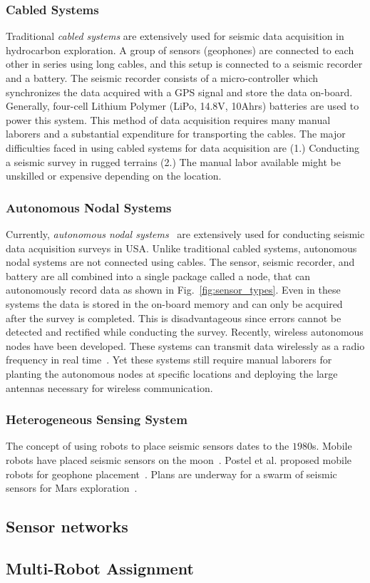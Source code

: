 \subsubsection{Cabled Systems}
 Traditional \emph{cabled systems} are extensively used for seismic data acquisition in hydrocarbon exploration. A group of sensors (geophones) are connected to each other in series using long cables, and this setup is connected to a seismic recorder and a battery. The seismic recorder consists of a micro-controller which synchronizes the data acquired with a GPS signal and store the data on-board. Generally, four-cell Lithium Polymer (LiPo, 14.8V, 10Ahrs) batteries are used to power this system. This method of data acquisition requires many manual laborers and a substantial expenditure for transporting the cables. The major difficulties faced in using cabled systems for data acquisition are (1.) Conducting a seismic survey in rugged terrains (2.) The manual labor available might be unskilled or expensive depending on the location.  
 \subsubsection{Autonomous Nodal Systems}
 Currently, \emph{autonomous nodal systems}~\cite{wood1998distributed} are extensively used for conducting seismic data acquisition surveys in USA. Unlike traditional cabled systems, autonomous nodal systems are not connected using cables. The sensor, seismic recorder, and battery are all combined into a single package called a node, that can autonomously record data as shown in Fig.~\ref{fig:sensor_types}. Even in these systems the data is stored in the on-board memory and can only be acquired after the survey is completed. This is disadvantageous since errors cannot be detected and rectified while conducting the survey. Recently, wireless autonomous nodes have been developed. These systems can transmit data wirelessly as a radio frequency in real time~\cite{jiang2015geophysical}. Yet these systems still require manual laborers for planting the autonomous nodes at specific locations and deploying the large antennas necessary for wireless communication.
\subsubsection{Heterogeneous Sensing System}
The concept of using robots to place seismic sensors dates to the $1980$s. Mobile robots have placed seismic sensors on the moon~\cite{LSisMSE81}. Postel et al. proposed mobile robots for geophone placement~\cite{DSSMaA14}. Plans are underway for a swarm of seismic sensors for Mars exploration~\cite{MAPL2006}.


\subsection{Sensor networks}
\subsection{Multi-Robot Assignment}